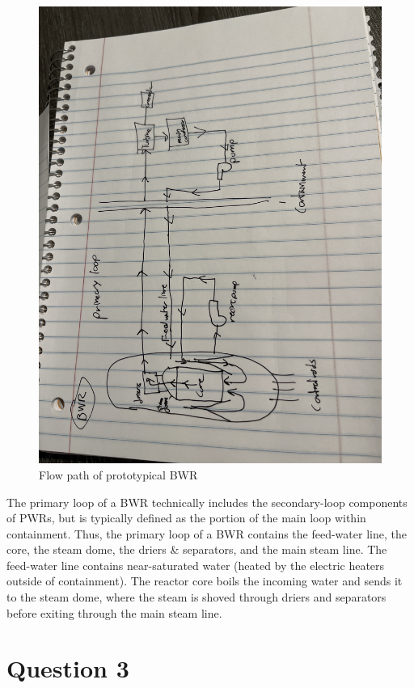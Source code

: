 \documentclass{article}
\begin{document}
\begin{figure}[!h!]
    \centering
    \includegraphics[width=0.9\linewidth,angle=180]{hw3BWR.JPG}
    \caption{Flow path of prototypical BWR}
    \label{fig:bwr}
\end{figure}

\newpage
The primary loop of a BWR technically includes the secondary-loop components of PWRs, but is typically defined as the portion of the main loop within containment. Thus, the primary loop of a BWR contains the feed-water line, the core, the steam dome, the driers \& separators, and the main steam line. The feed-water line contains near-saturated water (heated by the electric heaters outside of containment). The reactor core boils the incoming water and sends it to the steam dome, where the steam is shoved through driers and separators before exiting through the main steam line. 


\newpage
\section*{Question 3}
\end{document}
